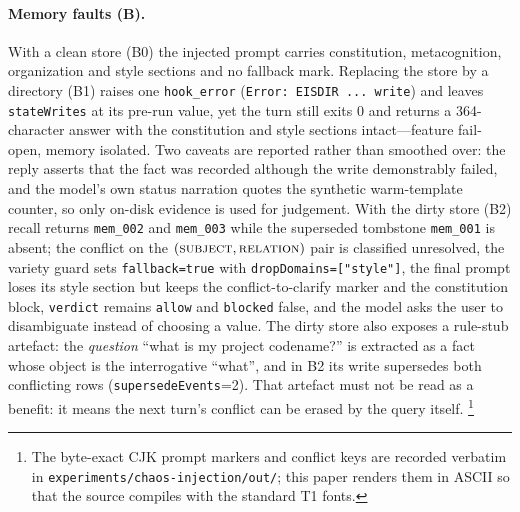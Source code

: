 \paragraph{Memory faults (B).} With a clean store (B0) the injected prompt carries
constitution, metacognition, organization and style sections and no fallback mark.
Replacing the store by a directory (B1) raises one \texttt{hook\_error}
(\texttt{Error:\allowbreak{} EISDIR .\allowbreak{}.\allowbreak{}.\allowbreak{} write}) and leaves \texttt{stateWrites} at its
pre-run value, yet the turn still exits 0 and returns a 364-character answer with
the constitution and style sections intact---feature fail-open, memory isolated.
Two caveats are reported rather than smoothed over: the reply asserts that the
fact was recorded although the write demonstrably failed, and the model's
own status narration quotes the synthetic warm-template counter, so only on-disk
evidence is used for judgement. With the dirty store (B2) recall returns
\texttt{mem\_002} and \texttt{mem\_003} while the superseded tombstone
\texttt{mem\_001} is absent; the conflict on the
$(\textsc{subject},\textsc{relation})$ pair is classified
unresolved, the variety guard sets \texttt{fallback=true} with
\texttt{dropDomains=["style"]}, the final prompt loses its style section but keeps
the conflict-to-clarify marker and the constitution block, \texttt{verdict} remains
\texttt{allow} and \texttt{blocked} false, and the model asks the user to
disambiguate instead of choosing a value. The dirty store also exposes a
rule-stub artefact: the \emph{question} ``what is my project codename?'' is
extracted as a fact whose object is the interrogative ``what'', and in B2 its
write supersedes both conflicting rows
(\texttt{supersedeEvents}=2). That artefact must not be read as a benefit: it
means the next turn's conflict can be erased by the query itself.
\footnote{The byte-exact CJK prompt markers and conflict keys are recorded
verbatim in \texttt{experiments/\allowbreak{}chaos-\allowbreak{}injection/\allowbreak{}out/\allowbreak{}}; this paper renders them in
ASCII so that the source compiles with the standard T1 fonts.}

